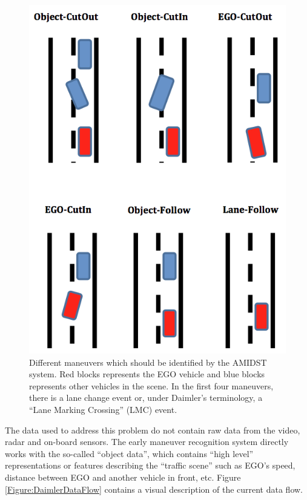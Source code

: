 \begin{figure}
\begin{center}
\includegraphics[scale=0.4]{./figures/DaimlerManeuvers}
\caption{\label{Figure:DaimlerManeuvers}Different maneuvers which should be identified by the AMIDST system.  Red blocks represents the EGO vehicle and blue blocks represents other vehicles in the scene. In the first four maneuvers, there is a lane change event or, under Daimler’s terminology, a ``Lane Marking Crossing'' (LMC) event. 
}
\end{center}
\end{figure}

The data used to address this problem do not contain raw data from the video, radar and on-board sensors. The early maneuver recognition system directly works with the so-called ``object data'', which contains ``high level'' representations or features describing the ``traffic scene'' such as EGO’s speed, distance between EGO and another vehicle in front, etc.  Figure \ref{Figure:DaimlerDataFlow} contains a visual description of the current data flow. 

